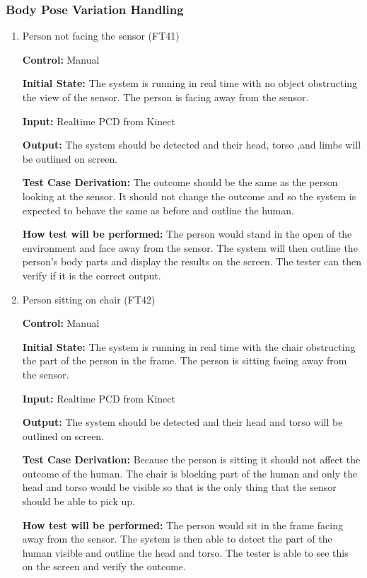 \documentclass[12pt, titlepage]{article}
\begin{document}
\subsubsection{Body Pose Variation Handling}

\begin{enumerate}
  \item{Person not facing the sensor (FT41)\label{FT41}}

  \textbf{Control:} Manual

  \textbf{Initial State:} The system is running in real time with no object obstructing the view of the sensor. The person is facing away from the sensor.
  
  \textbf{Input:} Realtime PCD from Kinect

  \textbf{Output:} The system should be detected and their head, torso ,and limbs will be outlined on screen.

  \textbf{Test Case Derivation:} The outcome should be the same as the person looking at the sensor. It should not change the outcome and so the system is expected to behave the same as before and outline the human.

  \textbf{How test will be performed:} The person would stand in the open of the environment and face away from the sensor. The system will then outline the person’s body parts and display the results on the screen. The tester can then verify if it is the correct output.

  \item{Person sitting on chair (FT42)\label{FT42}}

  \textbf{Control:} Manual

  \textbf{Initial State:} The system is running in real time with the chair obstructing the part of the person in the frame. The person is sitting facing away from the sensor.

  \textbf{Input:} Realtime PCD from Kinect 

  \textbf{Output:} The system should be detected and their head and torso will be outlined on screen.

  \textbf{Test Case Derivation:} Because the person is sitting it should not affect the outcome of the human. The chair is blocking part of the human and only the head and torso would be visible so that is the only thing that the sensor should be able to pick up.

  \textbf{How test will be performed:}  The person would sit in the frame facing away from the sensor. The system is then able to detect the part of the human visible and outline the head and torso. The tester is able to see this on the screen and verify the outcome.


\end{enumerate}
\end{document}
